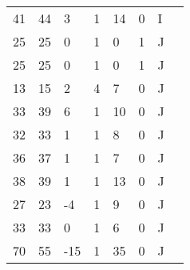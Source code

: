 \begin{longtable}{ p{2cm} p{2cm} p{2cm} p{2cm} p{2cm} p{2cm} p{2cm} p{2cm}}
 41 &  44 &   3 &   1 &  14 &   0 &   I \\ 
 25 &  25 &   0 &   1 &   0 &   1 &   J \\ 
 25 &  25 &   0 &   1 &   0 &   1 &   J \\ 
 13 &  15 &   2 &   4 &   7 &   0 &   J \\ 
 33 &  39 &   6 &   1 &  10 &   0 &   J \\ 
 32 &  33 &   1 &   1 &   8 &   0 &   J \\ 
 36 &  37 &   1 &   1 &   7 &   0 &   J \\ 
 38 &  39 &   1 &   1 &  13 &   0 &   J \\ 
 27 &  23 &  -4 &   1 &   9 &   0 &   J \\ 
 33 &  33 &   0 &   1 &   6 &   0 &   J \\ 
 70 &  55 & -15 &   1 &  35 &   0 &   J \\ 
   \hline
\end{longtable}